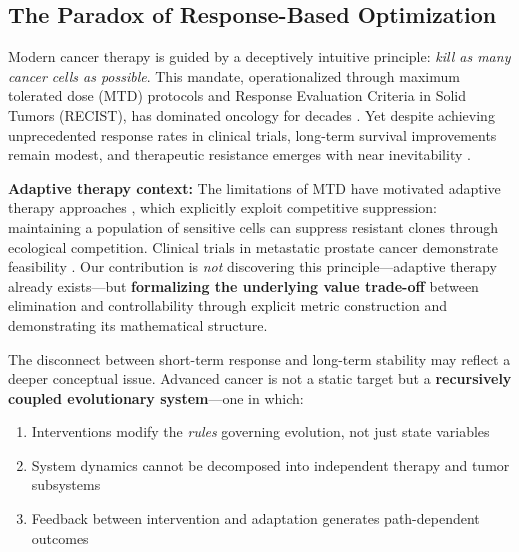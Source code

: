 \documentclass[11pt,a4paper]{article}
\begin{document}
\subsection{The Paradox of Response-Based Optimization}

Modern cancer therapy is guided by a deceptively intuitive principle: \textit{kill as many cancer cells as possible}. This mandate, operationalized through maximum tolerated dose (MTD) protocols and Response Evaluation Criteria in Solid Tumors (RECIST), has dominated oncology for decades \citep{eisenhauer2009new}. Yet despite achieving unprecedented response rates in clinical trials, long-term survival improvements remain modest, and therapeutic resistance emerges with near inevitability \citep{gerlinger2012intratumor, greaves2012clonal}.

\textbf{Adaptive therapy context:} The limitations of MTD have motivated adaptive therapy approaches \citep{gatenby2009adaptive, zhang2017integrating}, which explicitly exploit competitive suppression: maintaining a population of sensitive cells can suppress resistant clones through ecological competition. Clinical trials in metastatic prostate cancer demonstrate feasibility \citep{zhang2017integrating}. Our contribution is \textit{not} discovering this principle---adaptive therapy already exists---but \textbf{formalizing the underlying value trade-off} between elimination and controllability through explicit metric construction and demonstrating its mathematical structure.

The disconnect between short-term response and long-term stability may reflect a deeper conceptual issue. Advanced cancer is not a static target but a \textbf{recursively coupled evolutionary system}---one in which:
\begin{enumerate}
    \item Interventions modify the \textit{rules} governing evolution, not just state variables
    \item System dynamics cannot be decomposed into independent therapy and tumor subsystems
    \item Feedback between intervention and adaptation generates path-dependent outcomes
\end{enumerate}
\end{document}
